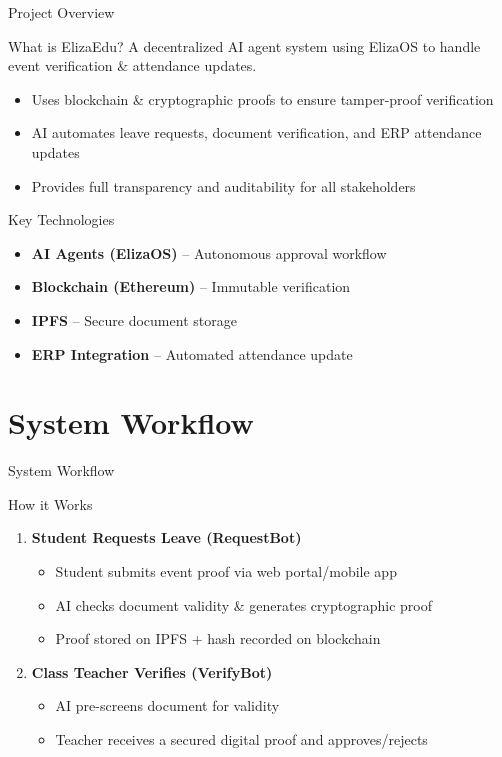 \documentclass{beamer}
\begin{document}
\begin{frame}{Project Overview}
\begin{block}{What is ElizaEdu?}
A decentralized AI agent system using ElizaOS to handle event verification \& attendance updates.
\end{block}

\begin{itemize}
    \item Uses blockchain \& cryptographic proofs to ensure tamper-proof verification
    \item AI automates leave requests, document verification, and ERP attendance updates
    \item Provides full transparency and auditability for all stakeholders
\end{itemize}

\begin{block}{Key Technologies}
\begin{itemize}
    \item \textbf{AI Agents (ElizaOS)} – Autonomous approval workflow
    \item \textbf{Blockchain (Ethereum)} – Immutable verification
    \item \textbf{IPFS} – Secure document storage
    \item \textbf{ERP Integration} – Automated attendance update
\end{itemize}
\end{block}
\end{frame}

\section{System Workflow}

\begin{frame}{System Workflow}
\begin{block}{How it Works}
\end{block}
\begin{enumerate}
    \item \textbf{Student Requests Leave (RequestBot)}
    \begin{itemize}
        \item Student submits event proof via web portal/mobile app
        \item AI checks document validity \& generates cryptographic proof
        \item Proof stored on IPFS + hash recorded on blockchain
    \end{itemize}
    
    \item \textbf{Class Teacher Verifies (VerifyBot)}
    \begin{itemize}
        \item AI pre-screens document for validity
        \item Teacher receives a secured digital proof and approves/rejects
    \end{itemize}
\end{enumerate}
\end{frame}
\end{document}
